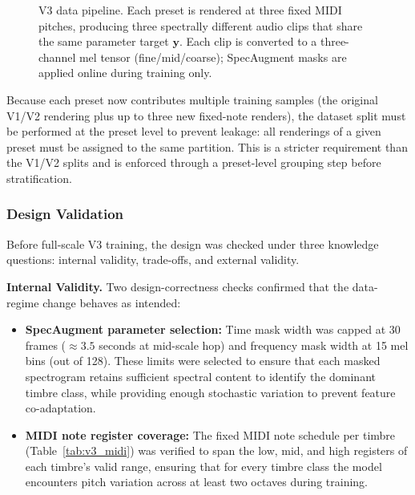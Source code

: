 \begin{figure}[H]
{%
}
\vspace{0.3cm}
\caption{V3 data pipeline. Each preset is rendered at three fixed MIDI pitches, producing three spectrally different audio clips that share the same parameter target $\mathbf{y}$. Each clip is converted to a three-channel mel tensor (fine/mid/coarse); SpecAugment masks are applied online during training only.}
\label{fig:v3_design}
\end{figure}

\noindent
Because each preset now contributes multiple training samples (the original V1/V2 rendering plus up to three new fixed-note renders), the dataset split must be performed at the preset level to prevent leakage: all renderings of a given preset must be assigned to the same partition. This is a stricter requirement than the V1/V2 splits and is enforced through a preset-level grouping step before stratification.

\subsubsection{Design Validation}

\noindent
Before full-scale V3 training, the design was checked under three knowledge questions: internal validity, trade-offs, and external validity.

\par \vspace{0.3cm}
\noindent\textbf{Internal Validity.} Two design-correctness checks confirmed that the data-regime change behaves as intended:
\begin{itemize}
    \item \textbf{SpecAugment parameter selection:} Time mask width was capped at 30 frames ($\approx 3.5$ seconds at mid-scale hop) and frequency mask width at 15 mel bins (out of 128). These limits were selected to ensure that each masked spectrogram retains sufficient spectral content to identify the dominant timbre class, while providing enough stochastic variation to prevent feature co-adaptation.

    \item \textbf{MIDI note register coverage:} The fixed MIDI note schedule per timbre (Table~\ref{tab:v3_midi}) was verified to span the low, mid, and high registers of each timbre's valid range, ensuring that for every timbre class the model encounters pitch variation across at least two octaves during training.
\end{itemize}

